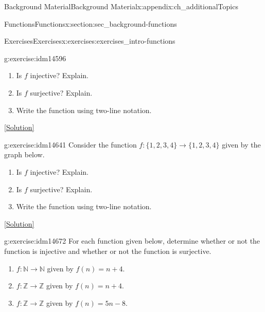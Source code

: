 \documentclass[oneside,10pt,]{book}
\numberwithin{equation}{chapter}
\def\N{\mathbb N}
\def\Z{\mathbb Z}
\begin{document}
\begin{appendixptx}{Background Material}{}{Background Material}{}{}{x:appendix:ch_additionalTopics}
\begin{sectionptx}{Functions}{}{Functions}{}{}{x:section:sec_background-functions}
\begin{exercises-subsection}{Exercises}{}{Exercises}{}{}{x:exercises:exercises_intro-functions}
\begin{divisionexercise}{3}{}{}{g:exercise:idm14596}
\par
%
\begin{enumerate}[label=(\alph*)]
\item{}Is \(f\) injective? Explain.%
\item{}Is \(f\) surjective? Explain.%
\item{}Write the function using two-line notation.%
\end{enumerate}
%
\space\hspace*{0pt}\hfill{\tiny\hyperlink{g:solution:idm14628-main}{[Solution]}}\end{divisionexercise}%
\begin{divisionexercise}{4}{}{}{g:exercise:idm14641}%
Consider the function \(f:\{1,2,3,4\} \to \{1,2,3,4\}\) given by the graph below.%
\begin{sidebyside}{1}{0.3}{0.3}{0}%
\begin{sbspanel}{0.4}%
%
\end{sbspanel}%
\end{sidebyside}%
\par
%
\begin{enumerate}[label=(\alph*)]
\item{}Is \(f\) injective? Explain.%
\item{}Is \(f\) surjective? Explain.%
\item{}Write the function using two-line notation.%
\end{enumerate}
%
\space\hspace*{0pt}\hfill{\tiny\hyperlink{g:solution:idm14658-main}{[Solution]}}\end{divisionexercise}%
\begin{divisionexercise}{5}{}{}{g:exercise:idm14672}%
For each function given below, determine whether or not the function is injective and whether or not the function is surjective.%
\begin{enumerate}[label=(\alph*)]
\item{}\(f:\N \to \N\) given by \(f(n) = n+4\).%
\item{}\(f:\Z \to \Z\) given by \(f(n) = n+4\).%
\item{}\(f:\Z \to \Z\) given by \(f(n) = 5n - 8\).%

\end{enumerate}
\end{divisionexercise}
\end{exercises-subsection}
\end{sectionptx}
\end{appendixptx}
\end{document}
